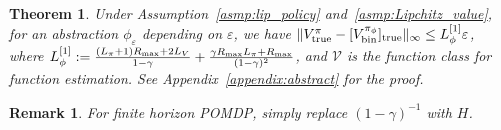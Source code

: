 \documentclass[twoside]{article}
\newtheorem{theorem}{Theorem}
\newtheorem{definition}{Definition}
\newtheorem{remark}{Remark}
\newcommand{\CAL}[1]{\mathcal{#1}}
\newcommand{\yplu}[1]{{\color{orange}{ [\textbf{Yiping:}} #1]}}
\begin{document}

\begin{theorem}\label{Thm:L_phi_1}  Under Assumption~\ref{asmp:lip_policy} and~\ref{asmp:Lipchitz_value}, for an abstraction $\phi_\varepsilon$  %
depending on
$\varepsilon$, we have $\|V_{\rm true}^{\pi}-[V_{\rm bin}^{\pi_\phi}]_{\rm true}\|_\infty\leq L_\phi^{[1]}\varepsilon$, where $L_\phi^{[1]}:=\frac{(L_\pi+1)R_{\rm max}+2L_V}{1-\gamma}+\frac{\gamma R_{\rm max}L_\pi+R_{\rm max}}{(1-\gamma)^2}$, and $\CAL{V}$ is the function class for function estimation. See Appendix~\ref{appendix:abstract} for the proof.
\end{theorem}
\begin{remark}
    For finite horizon POMDP, simply replace $(1-\gamma)^{-1}$ with $H$.
\end{remark}
\end{document}
